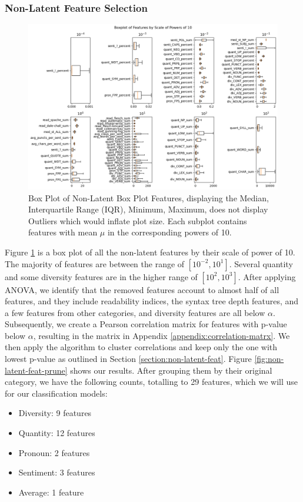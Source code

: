 \documentclass{article}
\begin{document}
\subsubsection{Non-Latent Feature Selection}
\begin{figure}[h]
  \centering
  \includegraphics[width=\textwidth]{img/non_latent_box_plot.png}
  \caption{Box Plot of Non-Latent Box Plot Features, displaying the Median, Interquartile Range (IQR), Minimum, Maximum, does not display Outliers which would inflate plot size. Each subplot contains features with mean $\mu$ in the corresponding powers of 10.}
  \label{box-plot}
\end{figure}

Figure \ref{box-plot} is a box plot of all the non-latent features by their scale of power of 10. The majority of features are between the range of $[10^{-2}, 10^{1}]$. Several quantity and some diversity features are in the higher range of $[10^2, 10^3]$. After applying ANOVA, we identify that the removed features account to almost half of all features, and they include readability indices, the syntax tree depth features, and a few features from other categories, and diversity features are all below $\alpha$. Subsequently, we create a Pearson correlation matrix for features with p-value below $\alpha$, resulting in the matrix in Appendix \ref{appendix:correlation-matrx}. We then apply the algorithm to cluster correlations and keep only the one with lowest p-value as outlined in Section \ref{section:non-latent-feat}. Figure \ref{fig:non-latent-feat-prune} shows our results. After grouping them by their original category, we have the following counts, totalling to 29 features, which we will use for our classification models:
\begin{itemize}
  \item Diversity: 9 features
  \item Quantity: 12 features
  \item Pronoun: 2 features
  \item Sentiment: 3 features
  \item Average: 1 feature
\end{itemize}
\end{document}
